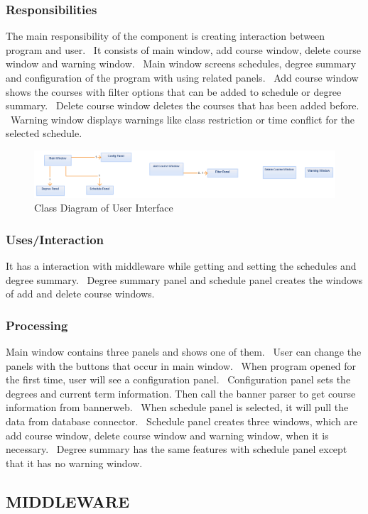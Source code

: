 \documentclass[twoside,letterpaper]{article}
\begin{document}
\subsubsection{Responsibilities}
The main responsibility of the component is creating interaction between program and user. \ It 
consists of main window, add course window, delete course window and warning window. \ Main window 
screens schedules, degree summary and configuration of the program with using related panels. \ Add 
course window shows the courses with filter options that can be added to schedule or degree summary. 
\ Delete course window deletes the courses that has been added before. \ Warning window displays 
warnings like class restriction or time conflict for the selected schedule.
\begin{figure}[h]
\centering
\includegraphics[width=\linewidth]{ui.png}
\caption{Class Diagram of User Interface}
\end{figure}

\subsubsection{Uses/Interaction}
It has a interaction with middleware while getting and setting the schedules and degree summary. \ Degree summary panel and schedule panel creates the windows of add and delete course windows.
\subsubsection{Processing}
Main window contains three panels and shows one of them. \ User can change the panels with the buttons that occur in main window. \ When program opened for the first time, user will see a configuration panel. \ Configuration panel sets the degrees and current term information. Then call the banner parser to get course information from bannerweb. \ When schedule panel is selected, it will pull the data from database connector. \ Schedule panel creates three windows, which are add course window, delete course window and warning window, when it is necessary. \  Degree summary has the same features with schedule panel except that it has no warning window.
\subsection{MIDDLEWARE}
\end{document}
